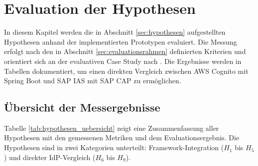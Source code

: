 \chapter{Evaluation der Hypothesen}
\label{ch:evaluation}

In diesem Kapitel werden die in Abschnitt \ref{sec:hypothesen} aufgestellten
Hypothesen anhand der implementierten Prototypen evaluiert. Die Messung erfolgt
nach den in Abschnitt \ref{sec:evaluationsrahmen} definierten Kriterien und
orientiert sich an der evaluativen Case Study nach \citep{Kitchenham1995}. Die
Ergebnisse werden in Tabellen dokumentiert, um einen direkten Vergleich
zwischen \ac{AWS} Cognito mit Spring Boot und \ac{SAP IAS} mit \ac{SAP CAP} zu
ermöglichen.


\section{Übersicht der Messergebnisse}

Tabelle \ref{tab:hypothesen_uebersicht} zeigt eine Zusammenfassung aller
Hypothesen mit den gemessenen Metriken und dem Evaluationsergebnis. Die
Hypothesen sind in zwei Kategorien unterteilt: Framework-Integration ($H_1$ bis
$H_5$) und direkter IdP-Vergleich ($H_6$ bis $H_9$).

